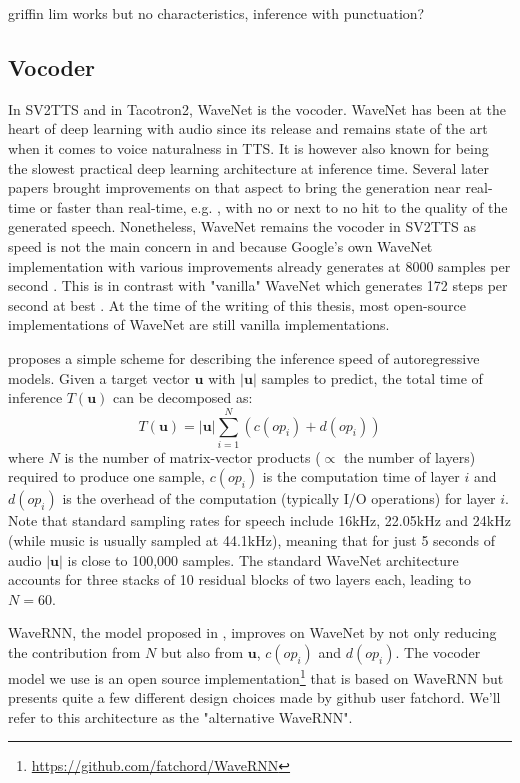 \documentclass[a4paper, oneside, 12pt, english]{article}
\begin{document}
\color{red} griffin lim works but no characteristics, inference with punctuation? \color{black}


\subsection{Vocoder} \label{vocoder}
In SV2TTS and in Tacotron2, WaveNet is the vocoder. WaveNet has been at the heart of deep learning with audio since its release and remains state of the art when it comes to voice naturalness in TTS. It is however also known for being the slowest practical deep learning architecture at inference time. Several later papers brought improvements on that aspect to bring the generation near real-time or faster than real-time, e.g. \citep{ParallelWaveNet, FastWaveNet, WaveRNN}, with no or next to no hit to the quality of the generated speech. Nonetheless, WaveNet remains the vocoder in SV2TTS as speed is not the main concern in \citep{SV2TTS} and because Google's own WaveNet implementation with various improvements already generates at 8000 samples per second \citep[page~2]{WaveRNN}. This is in contrast with "vanilla" WaveNet which generates 172 steps per second at best \citep[page 7]{ParallelWaveNet}. At the time of the writing of this thesis, most open-source implementations of WaveNet are still vanilla implementations.

\citep{WaveRNN} proposes a simple scheme for describing the inference speed of autoregressive models. Given a target vector $\mathbf{u}$ with $|\mathbf{u}|$ samples to predict, the total time of inference $T(\mathbf{u})$ can be decomposed as:
$$ T(\mathbf{u}) = |\mathbf{u}|\sum_{i=1}^{N}(c(op_i) + d(op_i)) $$
where $N$ is the number of matrix-vector products ($\propto$ the number of layers) required to produce one sample, $c(op_i)$ is the computation time of layer $i$ and $d(op_i)$ is the overhead of the computation (typically I/O operations) for layer $i$. Note that standard sampling rates for speech include 16kHz, 22.05kHz and 24kHz (while music is usually sampled at 44.1kHz), meaning that for just 5 seconds of audio $|\mathbf{u}|$ is close to 100,000 samples. The standard WaveNet architecture accounts for three stacks of 10 residual blocks of two layers each, leading to $N = 60$. 

WaveRNN, the model proposed in \citep{WaveRNN}, improves on WaveNet by not only reducing the contribution from $N$ but also from $\mathbf{u}$, $c(op_i)$ and $d(op_i)$. The vocoder model we use is an open source implementation\footnote{\url{https://github.com/fatchord/WaveRNN}} that is based on WaveRNN but presents quite a few different design choices made by github user fatchord. We'll refer to this architecture as the "alternative WaveRNN".
\end{document}
